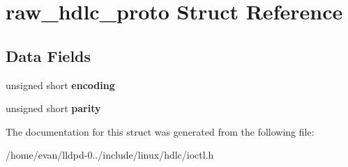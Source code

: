 \section{raw\-\_\-hdlc\-\_\-proto \-Struct \-Reference}
\label{structraw__hdlc__proto}
\subsection*{\-Data \-Fields}
\begin{DoxyCompactItemize}
\item 
unsigned short {\bfseries encoding}\label{structraw__hdlc__proto_a402e2ad7eb1196d18844d5d5fab00f74}

\item 
unsigned short {\bfseries parity}\label{structraw__hdlc__proto_af9bf5c7b1db40c514ff4aeb84c4ce448}

\end{DoxyCompactItemize}


\-The documentation for this struct was generated from the following file\-:\begin{DoxyCompactItemize}
\item 
/home/evan/lldpd-\/0../include/linux/hdlc/ioctl.\-h\end{DoxyCompactItemize}
